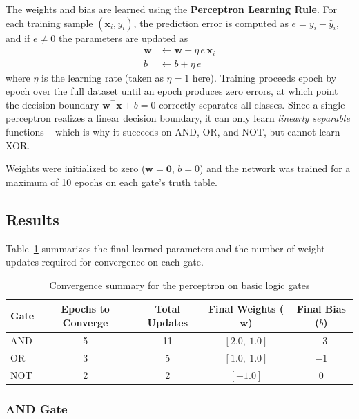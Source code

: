 \documentclass[12pt,a4paper]{article}
\begin{document}
The weights and bias are learned using the \textbf{Perceptron Learning Rule}. For
each training sample $(\mathbf{x}_i, y_i)$, the prediction error is computed as
$e = y_i - \hat{y}_i$, and if $e \neq 0$ the parameters are updated as
\begin{align}
    \mathbf{w} &\leftarrow \mathbf{w} + \eta \, e \, \mathbf{x}_i \\
    b &\leftarrow b + \eta \, e
\end{align}
where $\eta$ is the learning rate (taken as $\eta = 1$ here). Training proceeds
epoch by epoch over the full dataset until an epoch produces zero errors, at which
point the decision boundary $\mathbf{w}^{\top}\mathbf{x} + b = 0$ correctly
separates all classes. Since a single perceptron realizes a linear decision
boundary, it can only learn \textit{linearly separable} functions -- which is why
it succeeds on AND, OR, and NOT, but cannot learn XOR.

Weights were initialized to zero ($\mathbf{w} = \mathbf{0}$, $b = 0$) and the
network was trained for a maximum of 10 epochs on each gate's truth table.

\subsection{Results}

Table~\ref{tab:gate_summary} summarizes the final learned parameters and the
number of weight updates required for convergence on each gate.

\begin{table}[h!]
    \centering
    \caption{Convergence summary for the perceptron on basic logic gates}
    \label{tab:gate_summary}
    \begin{tabular}{lcccc}
        \toprule
        Gate & Epochs to Converge & Total Updates & Final Weights ($\mathbf{w}$) & Final Bias ($b$) \\
        \midrule
        AND & 5 & 11 & $[2.0,\ 1.0]$  & $-3$ \\
        OR  & 3 & 5  & $[1.0,\ 1.0]$  & $-1$ \\
        NOT & 2 & 2  & $[-1.0]$       & $0$  \\
        \bottomrule
    \end{tabular}
\end{table}

\subsubsection{AND Gate}
\end{document}
